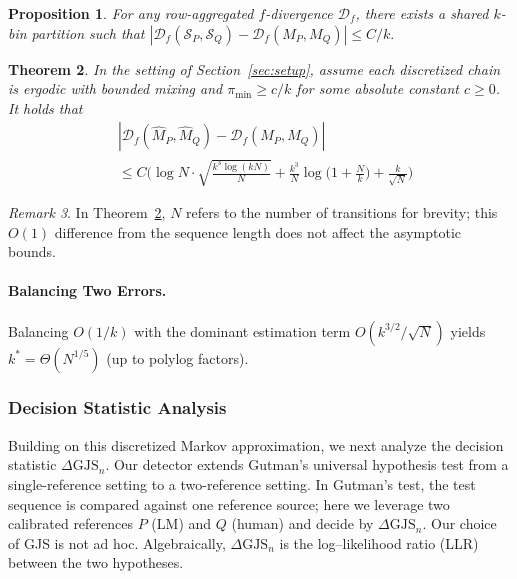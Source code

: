 \documentclass{article}
\theoremstyle{plain}
\newtheorem{theorem}{Theorem}[section]
\newtheorem{proposition}[theorem]{Proposition}
\theoremstyle{definition}
\theoremstyle{remark}
\newtheorem{remark}[theorem]{Remark}
\begin{document}
\begin{proposition}\label{prop:quant-error}
For any row-aggregated $f$-divergence $\mathcal{D}_f$, there exists a shared $k$-bin partition such that
$
|\mathcal{D}_f(\mathcal{S}_P,\mathcal{S}_Q)-\mathcal{D}_f(M_P,M_Q)| \le C/k.
$
\end{proposition}

\begin{theorem}\label{thm:sta-error}
In the setting of Section~\ref{sec:setup}, assume each discretized chain is ergodic with bounded mixing and $\pi_{\min}\ge c/k$ for some absolute constant $c\ge0$.
It holds that
\begin{align}
        &|\mathcal{D}_f(\hat M_P, \hat M_Q)-\mathcal{D}_f(M_P,M_Q)|\nonumber \\ &\leq  C\Big(\log N\cdot \sqrt{\frac{k^3\log(kN)}{N}}+\frac{k^3}{N}\log\big(1+\frac{N}{k}\big)+\frac{k}{\sqrt{N}} \Big) \nonumber
    \end{align}
\end{theorem}
\begin{remark}
In Theorem~\ref{thm:sta-error}, $N$ refers to the number of transitions for brevity; this $O(1)$ difference from the sequence length does not affect the asymptotic bounds.
\end{remark}
\paragraph{Balancing Two Errors.}
Balancing $O(1/k)$ with the dominant estimation term $ O(k^{3/2}/\sqrt N)$ yields
$
k^*=\Theta(N^{1/5})
$
(up to polylog factors).




\subsubsection{Decision Statistic Analysis}
Building on this discretized Markov approximation, we next analyze the decision
statistic $\Delta \mathrm{GJS}_n$. Our detector extends Gutman’s universal hypothesis test \citep{32134} from a single-reference setting to a two-reference setting. In Gutman’s test, the test sequence is compared against one reference source; here we leverage two calibrated references $P$ (LM) and $Q$ (human) and decide by $\Delta \text{GJS}_n$. Our choice of GJS is not ad hoc. Algebraically, $\Delta \text{GJS}_n$ is the log–likelihood ratio (LLR) between the two hypotheses. 
\end{document}
